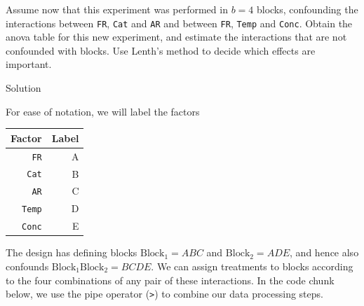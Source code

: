 \documentclass[
]{book}
\theoremstyle{definition}
\theoremstyle{definition}
\theoremstyle{definition}
\theoremstyle{definition}
\theoremstyle{remark}
\begin{document}
\begin{enumerate}
  Assume now that this experiment was performed in \(b=4\) blocks, confounding the interactions between \texttt{FR}, \texttt{Cat} and \texttt{AR} and between \texttt{FR}, \texttt{Temp} and \texttt{Conc}. Obtain the anova table for this new experiment, and estimate the interactions that are not confounded with blocks. Use Lenth's method to decide which effects are important.
\end{enumerate}

Solution

For ease of notation, we will label the factors

\begin{longtable}[]{@{}rr@{}}
\toprule
Factor & Label \\
\midrule
\endhead
\texttt{FR} & A \\
\texttt{Cat} & B \\
\texttt{AR} & C \\
\texttt{Temp} & D \\
\texttt{Conc} & E \\
\bottomrule
\end{longtable}

The design has defining blocks \(\mathrm{Block}_1 = ABC\) and \(\mathrm{Block}_2 = ADE\), and hence also confounds \(\mathrm{Block}_1\mathrm{Block}_2 = BCDE\). We can assign treatments to blocks according to the four combinations of any pair of these interactions. In the code chunk below, we use the pipe operator (\texttt{\textbar{}\textgreater{}}) to combine our data processing steps.
\end{document}
